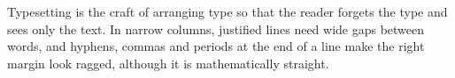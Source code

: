 Typesetting is the craft of arranging type so that the reader forgets the type and sees only the text. In narrow columns, justified lines need wide gaps between words, and hyphens, commas and periods at the end of a line make the right margin look ragged, although it is mathematically straight.
